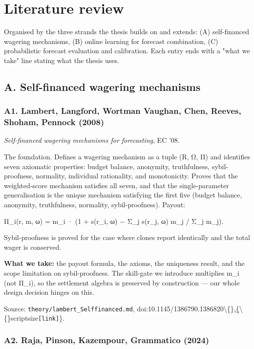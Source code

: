 \documentclass[11pt,a4paper,openany]{report}
\begin{document}
\chapter{Literature review}

Organised by the three strands the thesis builds on and extends:
(A) self-financed wagering mechanisms, (B) online learning for forecast
combination, (C) probabilistic forecast evaluation and calibration. Each
entry ends with a "what we take" line stating what the thesis uses.

\section{A. Self-financed wagering mechanisms}

\subsection{A1. Lambert, Langford, Wortman Vaughan, Chen, Reeves, Shoham, Pennock (2008)}

\emph{Self-financed wagering mechanisms for forecasting}, EC '08.

The foundation. Defines a wagering mechanism as a tuple (R, Ω, Π) and
identifies seven axiomatic properties: budget balance, anonymity,
truthfulness, sybil-proofness, normality, individual rationality, and
monotonicity. Proves that the weighted-score mechanism satisfies all
seven, and that the single-parameter generalisation is the unique
mechanism satisfying the first five (budget balance, anonymity,
truthfulness, normality, sybil-proofness). Payout:

Π\_i(r, m, ω) = m\_i · (1 + s(r\_i, ω) − Σ\_j s(r\_j, ω) m\_j / Σ\_j m\_j).

Sybil-proofness is proved for the case where clones report identically
and the total wager is conserved.

\textbf{What we take:} the payout formula, the axioms, the uniqueness result,
and the scope limitation on sybil-proofness. The skill-gate we introduce
multiplies m\_i (not Π\_i), so the settlement algebra is preserved by
construction — our whole design decision hinges on this.

Source: \texttt{theory/lambert\_Selffinanced.md},
doi:10.1145/1386790.1386820\textbackslash\{\},\href{https://doi.org/10.1145/1386790.1386820}\{\textbackslash\{\}scriptsize\texttt{[link]}\}.

\subsection{A2. Raja, Pinson, Kazempour, Grammatico (2024)}
\end{document}
